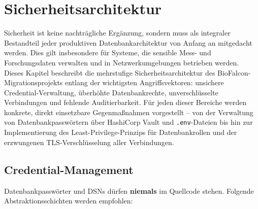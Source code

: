 ﻿\documentclass[12pt,a4paper]{report}
\theoremstyle{definition}
\theoremstyle{remark}
\newcommand{\code}[1]{\texttt{#1}}
\begin{document}
\chapter{Sicherheitsarchitektur}
\label{sec:security}

Sicherheit ist keine nachträgliche Ergänzung, sondern muss als integraler Bestandteil jeder produktiven Datenbankarchitektur von Anfang an mitgedacht werden. Dies gilt insbesondere für Systeme, die sensible Mess- und Forschungsdaten verwalten und in Netzwerkumgebungen betrieben werden. Dieses Kapitel beschreibt die mehrstufige Sicherheitsarchitektur des BioFalcon-Migrationsprojekts entlang der wichtigsten Angriffsvektoren: unsichere Credential-Verwaltung, überhöhte Datenbankrechte, unverschlüsselte Verbindungen und fehlende Auditierbarkeit. Für jeden dieser Bereiche werden konkrete, direkt einsetzbare Gegenmaßnahmen vorgestellt -- von der Verwaltung von Datenbankpasswörtern über HashiCorp Vault und \code{.env}-Dateien bis hin zur Implementierung des Least-Privilege-Prinzips für Datenbankrollen und der erzwungenen TLS-Verschlüsselung aller Verbindungen.

\section{Credential-Management}

Datenbankpassw\"orter und DSNs dürfen \textbf{niemals} im Quellcode
stehen. Folgende Abstraktionsschichten werden empfohlen:
\end{document}
